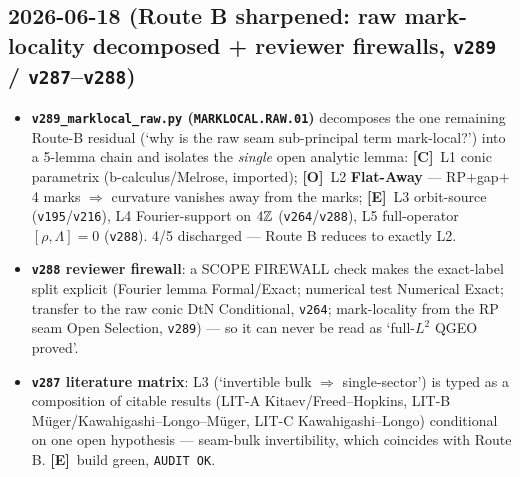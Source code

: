 \documentclass[11pt]{article}
\providecommand{\mE}{\textbf{[E]}}\providecommand{\mC}{\textbf{[C]}}
\providecommand{\mO}{\textbf{[O]}}\providecommand{\mX}{\textbf{[X]}}
\providecommand{\vref}[1]{\texttt{#1}}
\begin{document}
\subsection*{2026-06-18 (Route B sharpened: raw mark-locality decomposed + reviewer firewalls, \texttt{v289} / \texttt{v287}--\texttt{v288})}
\begin{itemize}
\item \textbf{\texttt{v289\_marklocal\_raw.py} (\texttt{MARKLOCAL.RAW.01})} decomposes the one remaining
  Route-B residual (`why is the raw seam sub-principal term mark-local?') into a 5-lemma chain and
  isolates the \emph{single} open analytic lemma: \mC\ L1 conic parametrix (b-calculus/Melrose, imported);
  \mO\ L2 \textbf{Flat-Away} --- RP$+$gap$+$4 marks $\Rightarrow$ curvature vanishes away from the marks;
  \mE\ L3 orbit-source (\vref{v195}/\vref{v216}), L4 Fourier-support on $4\mathbb{Z}$ (\vref{v264}/\vref{v288}),
  L5 full-operator $[\rho,\Lambda]{=}0$ (\vref{v288}). 4/5 discharged --- Route B reduces to exactly L2.
\item \textbf{\texttt{v288} reviewer firewall}: a SCOPE FIREWALL check makes the exact-label split explicit
  (Fourier lemma Formal/Exact; numerical test Numerical Exact; transfer to the raw conic DtN Conditional,
  \vref{v264}; mark-locality from the RP seam Open Selection, \vref{v289}) --- so it can never be read as
  `full-$L^2$ QGEO proved'.
\item \textbf{\texttt{v287} literature matrix}: L3 (`invertible bulk $\Rightarrow$ single-sector') is typed as
  a composition of citable results (LIT-A Kitaev/Freed--Hopkins, LIT-B M\"uger/Kawahigashi--Longo--M\"uger,
  LIT-C Kawahigashi--Longo) conditional on one open hypothesis --- seam-bulk invertibility, which coincides
  with Route B. \mE\ build green, \texttt{AUDIT OK}.
\end{itemize}
\end{document}
